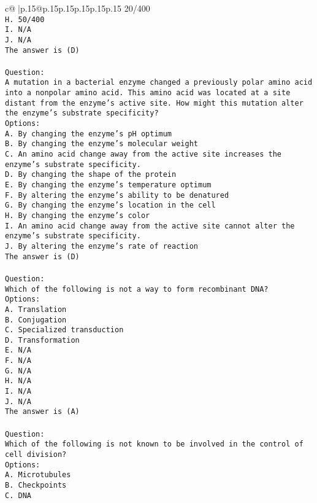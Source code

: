 \documentclass{article}
\begin{document}
{\begin{supertabular}{c@{$\;$}|p{.15\linewidth}@{}p{.15\linewidth}p{.15\linewidth}p{.15\linewidth}p{.15\linewidth}p{.15\linewidth}}
{{{20/400\\ \tt H. 50/400\\ \tt I. N/A\\ \tt J. N/A\\ \tt The answer is (D)\\ \tt \\ \tt Question:\\ \tt A mutation in a bacterial enzyme changed a previously polar amino acid into a nonpolar amino acid. This amino acid was located at a site distant from the enzyme’s active site. How might this mutation alter the enzyme’s substrate specificity?\\ \tt Options:\\ \tt A. By changing the enzyme’s pH optimum\\ \tt B. By changing the enzyme's molecular weight\\ \tt C. An amino acid change away from the active site increases the enzyme's substrate specificity.\\ \tt D. By changing the shape of the protein\\ \tt E. By changing the enzyme's temperature optimum\\ \tt F. By altering the enzyme's ability to be denatured\\ \tt G. By changing the enzyme’s location in the cell\\ \tt H. By changing the enzyme's color\\ \tt I. An amino acid change away from the active site cannot alter the enzyme’s substrate specificity.\\ \tt J. By altering the enzyme's rate of reaction\\ \tt The answer is (D)\\ \tt \\ \tt Question:\\ \tt Which of the following is not a way to form recombinant DNA?\\ \tt Options:\\ \tt A. Translation\\ \tt B. Conjugation\\ \tt C. Specialized transduction\\ \tt D. Transformation\\ \tt E. N/A\\ \tt F. N/A\\ \tt G. N/A\\ \tt H. N/A\\ \tt I. N/A\\ \tt J. N/A\\ \tt The answer is (A)\\ \tt \\ \tt Question:\\ \tt Which of the following is not known to be involved in the control of cell division?\\ \tt Options:\\ \tt A. Microtubules\\ \tt B. Checkpoints\\ \tt C. DNA }}}
\end{supertabular}}
\end{document}
